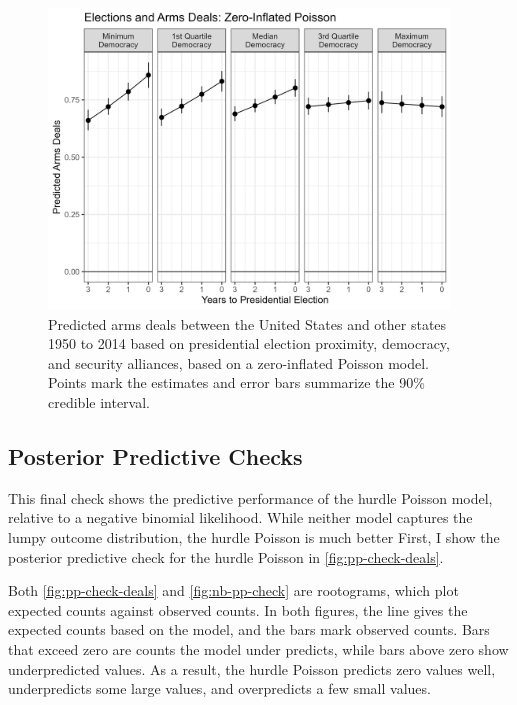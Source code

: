 \documentclass[12pt]{article}
\begin{document}
\begin{figure}[htpb]
	\centering
		\includegraphics[width=0.95\textwidth]{deals-pred-zip.png}
	\caption{{Predicted arms deals between the United States and other states 1950 to 2014 based on presidential election proximity, democracy, and security alliances, based on a zero-inflated Poisson model. Points mark the estimates and error bars summarize the 90\% credible interval.}}
	\label{fig:deals-pred-zip}
\end{figure}

\newpage

\subsection{Posterior Predictive Checks}


This final check shows the predictive performance of the hurdle Poisson model, relative to a negative binomial likelihood. 
While neither model captures the lumpy outcome distribution, the hurdle Poisson is much better 
First, I show the posterior predictive check for the hurdle Poisson in \autoref{fig:pp-check-deals}. 


Both \autoref{fig:pp-check-deals} and \autoref{fig:nb-pp-check} are rootograms, which plot expected counts against observed counts. 
In both figures, the line gives the expected counts based on the model, and the bars mark observed counts. 
Bars that exceed zero are counts the model under predicts, while bars above zero show underpredicted values. 
As a result, the hurdle Poisson predicts zero values well, underpredicts some large values, and overpredicts a few small values. 
\end{document}
